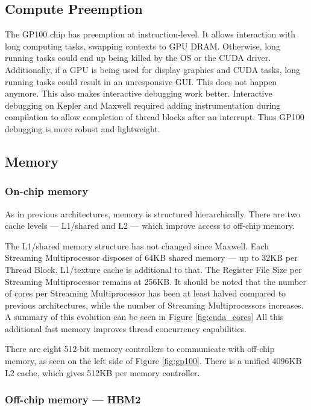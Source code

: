 \subsection{Compute Preemption}
The GP100 chip has preemption at instruction-level.
It allows interaction with long computing tasks, swapping contexts to GPU DRAM.
Otherwise, long running tasks could end up being killed by the OS or the CUDA driver.
Additionally, if a GPU is being used for display graphics and CUDA tasks, long running tasks could result in an unresponsive GUI.
This does not happen anymore.
This also makes interactive debugging work better.
Interactive debugging on Kepler and Maxwell required adding instrumentation during compilation to allow completion of thread blocks after an interrupt.
Thus GP100 debugging is more robust and lightweight.

\subsection{Memory}
\subsubsection{On-chip memory}
As in previous architectures, memory is structured hierarchically.
There are two cache levels --- L1/shared and L2 --- which improve access to off-chip memory.

The L1/shared memory structure has not changed since Maxwell.
Each Streaming Multiprocessor disposes of 64KB shared memory --- up to 32KB per Thread Block.
L1/texture cache is additional to that.
The Register File Size per Streaming Multiprocessor remains at 256KB.
It should be noted that the number of cores per Streaming Multiprocessor has been at least halved compared to previous architectures, while the number of Streaming Multiprocessors increases.
A summary of this evolution can be seen in Figure \ref{fig:cuda_cores}
All this additional fast memory improves thread concurrency capabilities.

There are eight 512-bit memory controllers to communicate with off-chip memory, as seen on the left side of Figure \ref{fig:gp100}.
There is a unified 4096KB L2 cache, which gives 512KB per memory controller.

\subsubsection{Off-chip memory --- HBM2}

